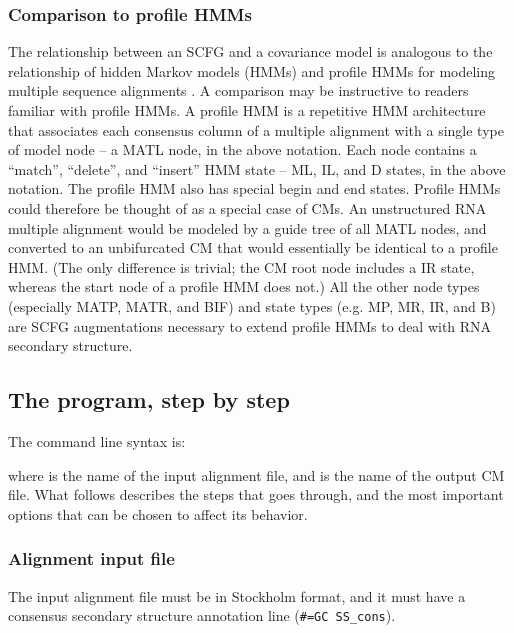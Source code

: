 \subsubsection{Comparison to profile HMMs}

The relationship between an SCFG and a covariance model is analogous
to the relationship of hidden Markov models (HMMs) and profile HMMs
for modeling multiple sequence alignments
\cite{Krogh94,Durbin98,Eddy98}. A comparison may be instructive to
readers familiar with profile HMMs.  A profile HMM is a repetitive HMM
architecture that associates each consensus column of a multiple
alignment with a single type of model node -- a MATL node, in the
above notation. Each node contains a ``match'', ``delete'', and
``insert'' HMM state -- ML, IL, and D states, in the above notation.
The profile HMM also has special begin and end states. Profile HMMs
could therefore be thought of as a special case of CMs. An
unstructured RNA multiple alignment would be modeled by a guide tree
of all MATL nodes, and converted to an unbifurcated CM that would
essentially be identical to a profile HMM. (The only difference is
trivial; the CM root node includes a IR state, whereas the start node
of a profile HMM does not.) All the other node types (especially MATP,
MATR, and BIF) and state types (e.g. MP, MR, IR, and B) are SCFG
augmentations necessary to extend profile HMMs to deal with RNA
secondary structure.


\subsection{The  program, step by step}

The  command line syntax is:


where \prog{[alifile]} is the name of the input alignment file, and
\prog{[cmfile]} is the name of the output CM file. What follows
describes the steps that  goes through, and the most
important options that can be chosen to affect its behavior.

\subsubsection{Alignment input file}

The input alignment file must be in Stockholm format, and it must have
a consensus secondary structure annotation line (\verb+#=GC SS_cons+).

